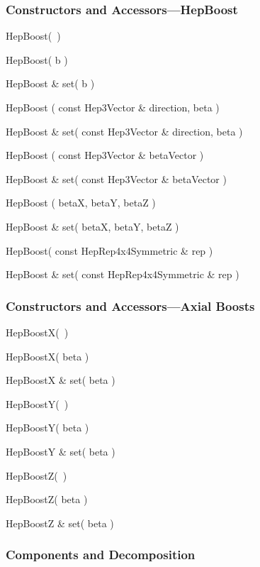 \subsubsection{Constructors and Accessors---HepBoost}

\begin{shortlist}
  \item HepBoost(~)
  \item HepBoost( b )
  \item HepBoost \& set( b )
  \item HepBoost ( const Hep3Vector \& direction, beta ) 
							\see{\ref{eq:boostform}}
  \item HepBoost \& set( const Hep3Vector \& direction, beta )

  \item HepBoost ( const Hep3Vector \& betaVector ) 
							\see{\ref{eq:boostform}}
  \item HepBoost \& set( const Hep3Vector \& betaVector )
  \item HepBoost ( betaX, betaY, betaZ ) 		\see{\ref{eq:boostform}}
  \item HepBoost \& set( betaX, betaY, betaZ ) 
  \item HepBoost( const HepRep4x4Symmetric \& rep )
  \item HepBoost \& set( const HepRep4x4Symmetric \& rep )

\subsubsection{Constructors and Accessors---Axial Boosts}
  \item HepBoostX(~)
  \item HepBoostX( beta )		\see{\ref{eq:boostx}}
  \item HepBoostX \& set( beta )	
  \item HepBoostY(~)
  \item HepBoostY( beta )		
  \item HepBoostY \& set( beta )	
  \item HepBoostZ(~)
  \item HepBoostZ( beta )		
  \item HepBoostZ \& set( beta )	
\end{shortlist}

\subsubsection{Components and Decomposition} 

